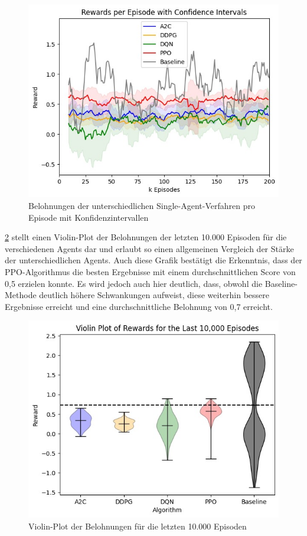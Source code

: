 \documentclass[twocolumn]{webofc}
\begin{document}
\begin{figure}[h]
	\centering
   \includegraphics[width=\columnwidth]{img/example1.jpeg}
	\caption{Belohnungen der unterschiedlichen Single-Agent-Verfahren pro Episode mit Konfidenzintervallen}
	\label{fig:bild1}
\end{figure}

\ref{fig:bild2} stellt einen Violin-Plot der Belohnungen der letzten 10.000 Episoden für die verschiedenen Agents dar und erlaubt so einen allgemeinen Vergleich der Stärke der unterschiedlichen Agents. Auch diese Grafik bestätigt die Erkenntnis, dass der \ac{PPO}-Algorithmus die besten Ergebnisse mit einem durchschnittlichen Score von 0,5 erzielen konnte. Es wird jedoch auch hier deutlich, dass, obwohl die Baseline-Methode deutlich höhere Schwankungen aufweist, diese weiterhin bessere Ergebnisse erreicht und eine durchschnittliche Belohnung von 0,7 erreicht.

\begin{figure}[h]
	\centering
   \includegraphics[width=\columnwidth]{img/example2.jpeg}
	\caption{Violin-Plot der Belohnungen für die letzten 10.000 Episoden}
	\label{fig:bild2}
\end{figure}
\end{document}
